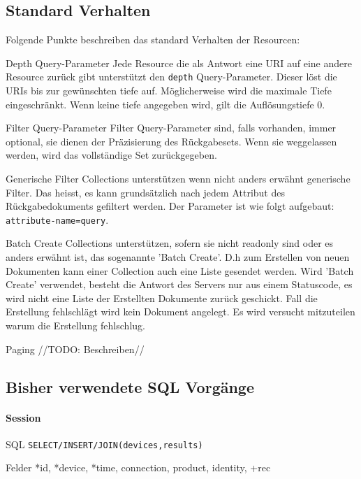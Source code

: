 \documentclass[10pt,a4paper]{scrartcl}
\begin{document}
\subsection{Standard Verhalten}
Folgende Punkte beschreiben das standard Verhalten der Resourcen:
\begin{description*}
	\item[Depth Query-Parameter] Jede Resource die als Antwort eine URI auf eine andere Resource zurück gibt						 unterstützt den \texttt{depth} Query-Parameter. Dieser löst die URIs bis zur gewünschten tiefe auf. Möglicherweise wird die maximale Tiefe eingeschränkt. Wenn keine tiefe angegeben wird, gilt die Auflösungstiefe 0.
	\item[Filter Query-Parameter] Filter Query-Parameter sind, falls vorhanden, immer optional, sie dienen der Präzisierung des Rückgabesets. Wenn sie weggelassen werden, wird das vollständige Set zurückgegeben.
	\item[Generische Filter] Collections unterstützen wenn nicht anders erwähnt generische Filter. Das heisst, es kann grundsätzlich nach jedem Attribut des Rückgabedokuments gefiltert werden. Der Parameter ist wie folgt aufgebaut: \texttt{attribute-name=query}.
	\item[Batch Create] Collections unterstützen, sofern sie nicht readonly sind oder es anders erwähnt ist, das sogenannte 'Batch Create'. D.h zum Erstellen von neuen Dokumenten kann einer Collection auch eine Liste gesendet werden. Wird 'Batch Create' verwendet, besteht die Antwort des Servers nur aus einem Statuscode, es wird nicht eine Liste der Erstellten Dokumente zurück geschickt. Fall die Erstellung fehlschlägt wird kein Dokument angelegt. Es wird versucht mitzuteilen warum die Erstellung fehlschlug.
	\item[Paging] //TODO: Beschreiben//  
\end{description*}
 
\pagebreak
\subsection{Bisher verwendete SQL Vorgänge}
\paragraph{Session}
\begin{description*}
	\item[SQL] \texttt{SELECT/INSERT/JOIN(devices,results)}
	\item[Felder] *id, *device, *time, connection, product, identity, +rec
\end{description*}
\end{document}
